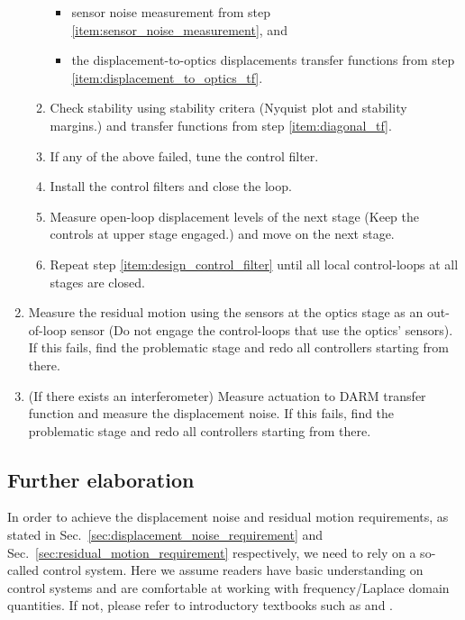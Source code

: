 \begin{enumerate}
\begin{enumerate}
\begin{itemize}
			\item sensor noise measurement from step \ref{item:sensor_noise_measurement}, and
			\item the displacement-to-optics displacements transfer functions from step \ref{item:displacement_to_optics_tf}.
		\end{itemize} 
		\item Check stability using stability critera (Nyquist plot and stability margins.) and transfer functions from step \ref{item:diagonal_tf}.
		\item If any of the above failed, tune the control filter.
		\item Install the control filters and close the loop.
		\item Measure open-loop displacement levels of the next stage (Keep the controls at upper stage engaged.) and move on the next stage. \label{item:open_loop_displacement_levels}
		\item Repeat step \ref{item:design_control_filter} until all local control-loops at all stages are closed.
	\end{enumerate}
	\item Measure the residual motion using the sensors at the optics stage as an out-of-loop sensor (Do not engage the control-loops that use the optics' sensors). If this fails, find the problematic stage and redo all controllers starting from there.
	\item (If there exists an interferometer) Measure actuation to DARM transfer function and measure the displacement noise. If this fails, find the problematic stage and redo all controllers starting from there.
\end{enumerate}

\subsection{Further elaboration}
In order to achieve the displacement noise and residual motion requirements, as stated in Sec.~\ref{sec:displacement_noise_requirement} and Sec.~\ref{sec:residual_motion_requirement} respectively, we need to rely on a so-called control system.
Here we assume readers have basic understanding on control systems and are comfortable at working with frequency/Laplace domain quantities.
If not, please refer to introductory textbooks such as \cite{modern_control_engineering} and \cite{control_engineering}.

